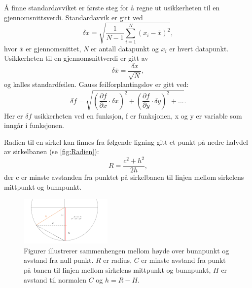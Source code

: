 Å finne standardavviket er første steg for å regne ut usikkerheten til en gjennomsnittsverdi.
Standardavvik \cite{Usikkerhet} er gitt ved
\begin{equation}
\label{eq:Standardavvik}
\delta{x}=\sqrt{\frac{1}{N-1}\sum\limits_{i=1}^N (x_{i}-\overline{x})^2},
\end{equation}
hvor $\overline{x}$ er gjennomsnittet, \textit{N} er antall datapunkt og $x_i$ er hvert datapunkt.
Usikkerheten til en gjennomsnittverdi \cite{Usikkerhet} er gitt av
\begin{equation}
\label{eq:Standardfeil}
\delta\overline{x} = \frac{\delta x}{\sqrt{N}},
\end{equation}
og kalles standardfeilen.
 Gauss feilforplantingslov \cite{Usikkerhet} er gitt ved:  
\begin{equation}
\label{eq:Gauss feilforplantningslov}
\delta f = \sqrt{(\frac{\partial f}{\partial x}\cdot\delta x)^2+(\frac{\partial f}{\partial y}\cdot\delta y)^2 + ...} .
\end{equation}
Her er $\delta f$ usikkerheten ved en funksjon, f er funksjonen, x og y er variable som inngår i funksjonen.

Radien til en sirkel kan finnes fra følgende ligning gitt et punkt på nedre halvdel av sirkelbanen (se  \autoref{fig:Radien}):
\begin{equation}
\label{eq:Sirkelradius}
R = \frac {c^2+h^2}{2h},
\end{equation}
der c er minste avstanden fra punktet på sirkelbanen til linjen mellom sirkelens mittpunkt og bunnpunkt.
\FloatBarrier
\begin{figure}[h!] 
\centering
\includegraphics[width=0.4\textwidth]{Rapport/Figurfikset.png}
\caption{Figurer illustrerer sammenhengen mellom høyde over bunnpunkt og avstand fra null punkt. $R$ er radius, $C$ er minste avstand fra punkt på banen til linjen mellom sirkelens mittpunkt og bunnpunkt, $H$ er avstand til normalen $C$ og $h = R - H.$}
\label{fig:Radien} %
\end{figure}
\FloatBarrier


